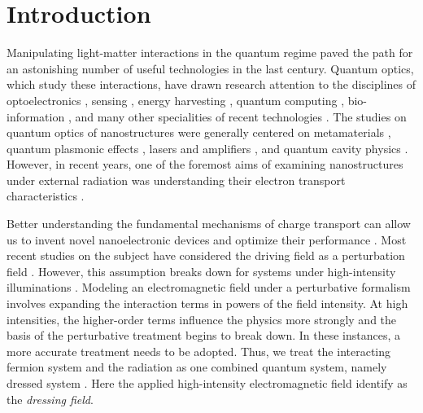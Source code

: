 \documentclass[
 reprint,
 amsmath,amssymb,
 aps,
 prb,
]{revtex4-2}
\begin{document}
\maketitle

\section{\label{sec_introduction} Introduction}

Manipulating light-matter interactions in the quantum regime paved the path for an astonishing number of useful technologies in the last century. Quantum optics, which study these interactions, have drawn research attention to the disciplines of optoelectronics \cite{liu16,wijesekara20,tao21,wijesekara21}, sensing \cite{rodrigo15,pirandola18,hapuarachchi2018}, energy harvesting \cite{weeraddana15,yuan16,sun18},
quantum computing \cite{huh15,slussarenko19,andersen21}, bio-information \cite{marais18,bian20}, and many other specialities of recent technologies \cite{rivera20}.
The studies on quantum optics of nanostructures were generally centered on metamaterials \cite{shalaev07,si14}, quantum plasmonic effects \cite{hapuarachchi19,perera20}, lasers and amplifiers \cite{chow13,jayasekara16,premaratne17}, and quantum cavity physics \cite{tsang10,liu17,devi20}.
However, in recent years, one of the foremost aims of examining nanostructures under external radiation was understanding their electron transport characteristics \cite{kitagawa11,zhou11,kibis14,pervishko15,morina15,dehghani15,dini16,wackerl20}.

Better understanding the fundamental mechanisms of charge transport can allow us to invent novel nanoelectronic devices and optimize their performance \cite{premaratne21}.
Most recent studies on the subject have considered the driving field as a perturbation field \cite{pervishko15,morina15}. However, this assumption breaks down for systems under high-intensity illuminations \cite{grifoni98,wackerl20}.
Modeling an electromagnetic field under a perturbative formalism involves expanding the interaction terms in powers of the field intensity. At high intensities, the higher-order terms influence the physics more strongly and the basis of the perturbative treatment begins to break down.
In these instances, a more accurate treatment needs to be adopted. Thus, we treat the interacting fermion system and the radiation as one combined quantum system, namely dressed system \cite{morina15,cohen98,scully01}. Here the applied high-intensity  electromagnetic field identify as the \textit{dressing field}.
\end{document}
